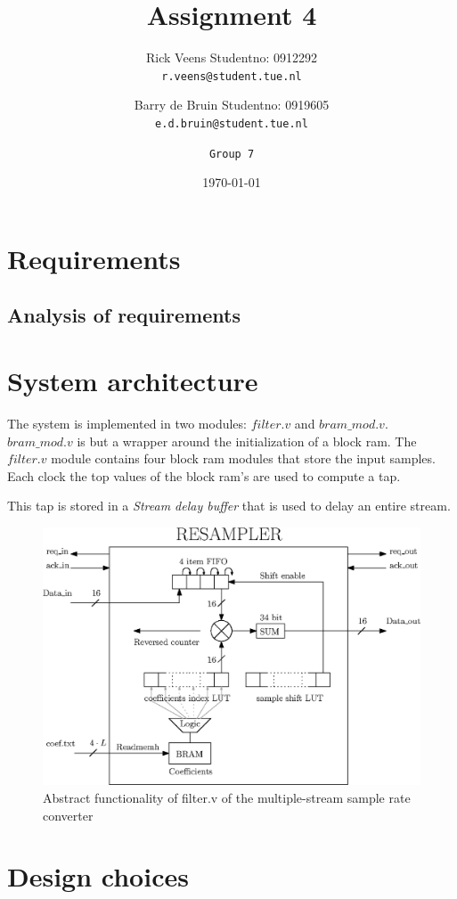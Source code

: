 \documentclass[a4paper,twoside,11pt, fleqn]{article}
\title{\vspace{-\baselineskip}\sffamily\bfseries Assignment 4}
\author{
	Rick Veens \qquad Studentno: 0912292\\
	\texttt{r.veens@student.tue.nl}
	\and
	Barry de Bruin \qquad Studentno: 0919605\\
	\texttt{e.d.bruin@student.tue.nl}
	\and
	\texttt{Group 7}
}
\date{\today}
\begin{document}
\maketitle
\newpage

\tableofcontents

\newpage

\section{Requirements}
\subsection{Analysis of requirements}
\section{System architecture}
The system is implemented in two modules: $filter.v$ and $bram\_mod.v$. $bram\_mod.v$ is but a wrapper around the initialization of a block ram.
The $filter.v$ module contains four block ram modules that store the input samples. Each clock the top values of the block ram's are used to compute a tap. 

This tap is stored in a \textit{Stream delay buffer} that is used to delay an entire stream.
\begin{figure}[h]
	\centering
	\includegraphics[scale = 1.0]{Images/5_blockdiagram.eps}
    \caption{Abstract functionality of filter.v of the multiple-stream sample rate converter}
    \label{fig:flow}
\end{figure}

\section{Design choices}
\end{document}
